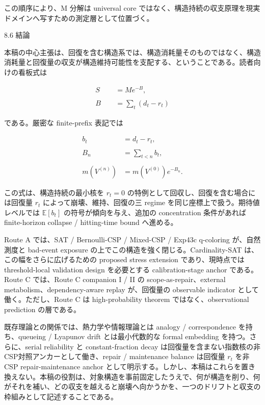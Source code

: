 \documentclass[12pt,a4paper]{article}
\begin{document}
この順序により、M 分解は universal core ではなく、構造持続の収支原理を現実ドメインへ写すための測定層として位置づく。

8.6 結論

本稿の中心主張は、回復を含む構造系では、構造消耗量そのものではなく、構造消耗量と回復量の収支が構造維持可能性を支配する、ということである。読者向けの看板式は

\[
\begin{aligned}
S &= M e^{-B}, \\
\qquad \\
B&=\sum_{t}(d_{t}-r_{t})
\end{aligned}
\]

である。厳密な finite-prefix 表記では

\[
\begin{aligned}
b_{t}&=d_{t}-r_{t}, \\
\qquad \\
B_{n}&=\sum_{t<n}b_{t}, \\
\qquad \\
m(V^{(n)})&=m(V^{(0)})e^{-B_{n}}.
\end{aligned}
\]

この式は、構造持続の最小核を \(r_{t}=0\) の特例として回収し、回復を含む場合には回復量 \(r_{t}\) によって崩壊、維持、回復の三 regime を同じ座標上で扱う。期待値レベルでは \(\mathbb E[b_{t}]\) の符号が傾向を与え、追加の concentration 条件があれば finite-horizon collapse / hitting-time bound へ進める。

Route A では、SAT / Bernoulli-CSP / Mixed-CSP / Exp43c q-coloring が、自然測度と bad-event exposure の上でこの構造を強く閉じる。Cardinality-SAT は、この幅をさらに広げるための proposed stress extension であり、現時点では threshold-local validation design を必要とする calibration-stage anchor である。Route C では、Route C companion I / II の scope-as-repair、external metabolism、dependency-aware replay が、回復量の observable indicator として働く。ただし、Route C は high-probability theorem ではなく、observational prediction の層である。

既存理論との関係では、熱力学や情報理論とは analogy / correspondence を持ち、queueing / Lyapunov drift とは最小代数的な formal embedding を持つ。さらに、serial reliability と constant-fraction decay は回復量を含まない指数核の非CSP対照アンカーとして働き、repair / maintenance balance は回復量 \(r_{t}\) を非CSP repair-maintenance anchor として明示する。しかし、本稿はこれらを置き換えない。本稿の役割は、対象構造を事前固定したうえで、何が構造を削り、何がそれを補い、どの収支を越えると崩壊へ向かうかを、一つのドリフトと収支の枠組みとして記述することである。
\end{document}
